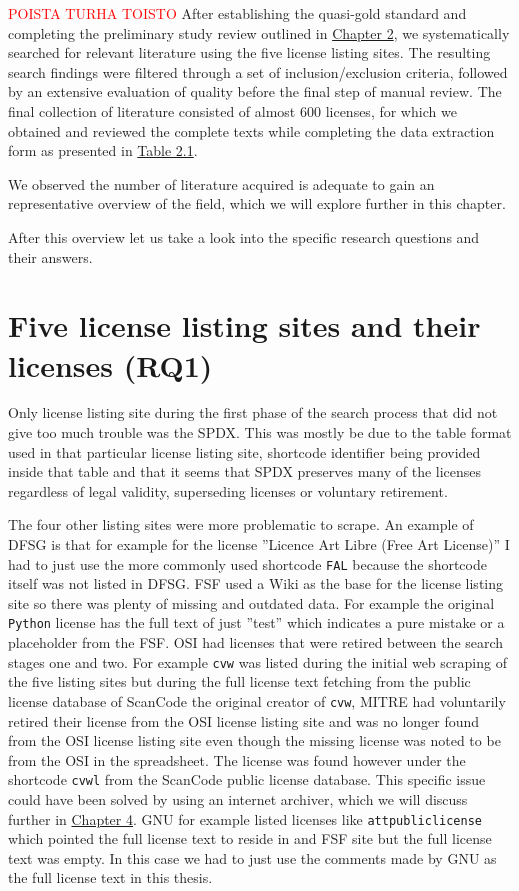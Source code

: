 \textcolor{red}{POISTA TURHA TOISTO}
After establishing the quasi-gold standard and completing the preliminary study review outlined in \hyperref[methods]{Chapter 2}, we systematically searched for relevant literature using the five license listing sites. The resulting search findings were filtered through a set of inclusion/exclusion criteria, followed by an extensive evaluation of quality before the final step of manual review. The final collection of literature consisted of almost 600 licenses, for which we obtained and reviewed the complete texts while completing the data extraction form as presented in \hyperref[table:extraction]{Table 2.1}.

We observed the number of literature acquired is adequate to gain an representative overview of the field, which we will explore further in this chapter.

After this overview let us take a look into the specific research questions and their answers.

\section{Five license listing sites and their licenses (RQ1)}
Only license listing site during the first phase of the search process that did not give too much trouble was the SPDX. This was mostly be due to the table format used in that particular license listing site, shortcode identifier being provided inside that table and that it seems that SPDX preserves many of the licenses regardless of legal validity, superseding licenses or voluntary retirement.

The four other listing sites were more problematic to scrape. An example of DFSG is that for example for the license ''Licence Art Libre (Free Art License)'' I had to just use the more commonly used shortcode \texttt{FAL} because the shortcode itself was not listed in DFSG. FSF used a Wiki as the base for the license listing site so there was plenty of missing and outdated data. For example the original \texttt{Python} license has the full text of just ''test'' which indicates a pure mistake or a placeholder from the FSF. OSI had licenses that were retired between the search stages one and two. For example \texttt{cvw} was listed during the initial web scraping of the five listing sites but during the full license text fetching from the public license database of ScanCode the original creator of \texttt{cvw}, MITRE had voluntarily retired their license from the OSI license listing site and was no longer found from the OSI license listing site even though the missing license was noted to be from the OSI in the spreadsheet. The license was found however under the shortcode \texttt{cvwl} from the ScanCode public license database. This specific issue could have been solved by using an internet archiver, which we will discuss further in \hyperref[discussion]{Chapter 4}. GNU for example listed licenses like \texttt{attpubliclicense} which pointed the full license text to reside in and FSF site but the full license text was empty. In this case we had to just use the comments made by GNU as the full license text in this thesis.

